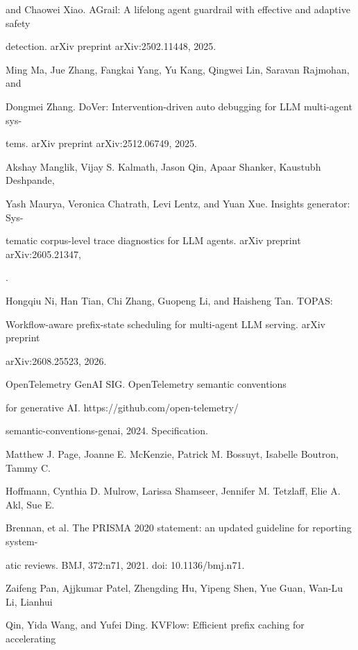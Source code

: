 \begin{flushleft}
\noindent  and Chaowei Xiao. AGrail: A lifelong agent guardrail with effective and adaptive safety\par
\noindent  detection. arXiv preprint arXiv:2502.11448, 2025.\par
\noindent [22] Ming Ma, Jue Zhang, Fangkai Yang, Yu Kang, Qingwei Lin, Saravan Rajmohan, and\par
\noindent  Dongmei Zhang. DoVer: Intervention-driven auto debugging for LLM multi-agent sys-\par
\noindent  tems. arXiv preprint arXiv:2512.06749, 2025.\par
\noindent [23] Akshay Manglik, Vijay S. Kalmath, Jason Qin, Apaar Shanker, Kaustubh Deshpande,\par
\noindent  Yash Maurya, Veronica Chatrath, Levi Lentz, and Yuan Xue. Insights generator: Sys-\par
\noindent  tematic corpus-level trace diagnostics for LLM agents. arXiv preprint arXiv:2605.21347,\par
{}.\par
\noindent [24] Hongqiu Ni, Han Tian, Chi Zhang, Guopeng Li, and Haisheng Tan. TOPAS:\par
\noindent  Workflow-aware prefix-state scheduling for multi-agent LLM serving. arXiv preprint\par
\noindent  arXiv:2608.25523, 2026.\par
\noindent [25] OpenTelemetry GenAI SIG. OpenTelemetry semantic conventions\par
\noindent  for generative AI. https://github.com/open-telemetry/\par
\noindent  semantic-conventions-genai, 2024. Specification.\par
\noindent [26] Matthew J. Page, Joanne E. McKenzie, Patrick M. Bossuyt, Isabelle Boutron, Tammy C.\par
\noindent  Hoffmann, Cynthia D. Mulrow, Larissa Shamseer, Jennifer M. Tetzlaff, Elie A. Akl, Sue E.\par
\noindent  Brennan, et al. The PRISMA 2020 statement: an updated guideline for reporting system-\par
\noindent  atic reviews. BMJ, 372:n71, 2021. doi: 10.1136/bmj.n71.\par
\noindent [27] Zaifeng Pan, Ajjkumar Patel, Zhengding Hu, Yipeng Shen, Yue Guan, Wan-Lu Li, Lianhui\par
\noindent  Qin, Yida Wang, and Yufei Ding. KVFlow: Efficient prefix caching for accelerating\par

\end{flushleft}
